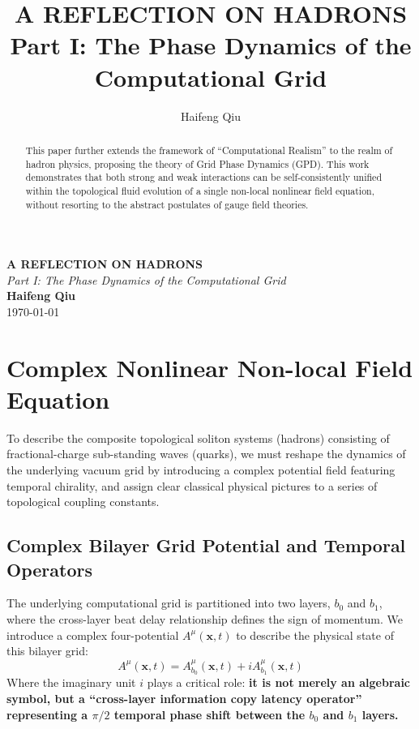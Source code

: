 \documentclass[12pt, a4paper]{article}
\title{A REFLECTION ON HADRONS Part I:  The Phase Dynamics of the Computational Grid}
\author{Haifeng Qiu}
\begin{document}
\begin{center}
    {\uppercase{\Large \textbf{A REFLECTION ON HADRONS}}} \\
    \vspace{0.5em}
    {\large \textit{Part I:  The Phase Dynamics of the Computational Grid}} \\
    \vspace{2em}
    \textbf{Haifeng Qiu} \\
    \today
    \vspace{2em}
\end{center}
\begin{abstract}
This paper further extends the framework of ``Computational Realism'' to the realm of hadron physics, proposing the theory of Grid Phase Dynamics (GPD). This work demonstrates that both strong and weak interactions can be self-consistently unified within the topological fluid evolution of a single non-local nonlinear field equation, without resorting to the abstract postulates of gauge field theories.
\end{abstract}

\section{Complex Nonlinear Non-local Field Equation}

To describe the composite topological soliton systems (hadrons) consisting of fractional-charge sub-standing waves (quarks), we must reshape the dynamics of the underlying vacuum grid by introducing a complex potential field featuring temporal chirality, and assign clear classical physical pictures to a series of topological coupling constants.

\subsection{Complex Bilayer Grid Potential and Temporal Operators}

The underlying computational grid is partitioned into two layers, $b_0$ and $b_1$, where the cross-layer beat delay relationship defines the sign of momentum. We introduce a complex four-potential $A^\mu(\mathbf{x}, t)$ to describe the physical state of this bilayer grid:
\begin{equation}
A^\mu(\mathbf{x}, t) = A^\mu_{b_0}(\mathbf{x}, t) + i A^\mu_{b_1}(\mathbf{x}, t) \label{eq:complex_A}
\end{equation}
Where the imaginary unit $i$ plays a critical role: \textbf{it is not merely an algebraic symbol, but a ``cross-layer information copy latency operator'' representing a $\pi/2$ temporal phase shift between the $b_0$ and $b_1$ layers.}
\end{document}
